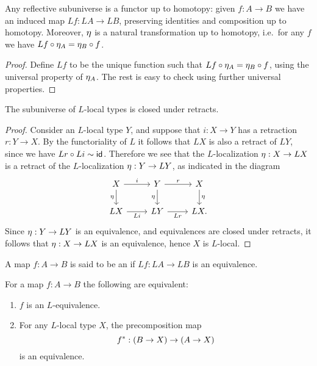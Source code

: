 \begin{lem}
  Any reflective subuniverse is a functor up to homotopy: given $f:A\to B$ we have an induced map $L f : L A \to L B$, preserving identities and composition up to homotopy.
  Moreover, $\modalunit$ is a natural transformation up to homotopy, i.e.\ for any $f$ we have $L f \circ \modalunit[A] = \modalunit[B] \circ f$.
\end{lem}

\begin{proof}
  Define $L f$ to be the unique function such that $L f \circ \modalunit[A] = \modalunit[B] \circ f$, using the universal property of $\modalunit[A]$.
  The rest is easy to check using further universal properties.
\end{proof}

\begin{cor}\label{cor:local_retract}
The subuniverse of $L$-local types is closed under retracts.
\end{cor}

\begin{proof}
Consider an $L$-local type $Y$, and suppose that $i:X\to Y$ has a retraction $r:Y\to X$. By the functoriality of $L$ it follows that $LX$ is also a retract of $LY$, since we have $Lr\circ Li\htpy \idfunc$. Therefore we see that the $L$-localization $\modalunit :X\to LX$ is a retract of the $L$-localization $\modalunit : Y\to LY$, as indicated in the diagram
\begin{equation*}
\begin{tikzcd}
X \arrow[r,"i"] \arrow[d,swap,"\modalunit"] & Y \arrow[d,swap,"\modalunit"] \arrow[r,"r"] & X \arrow[d,"\modalunit"] \\
LX \arrow[r,swap,"Li"] & LY \arrow[r,swap,"Lr"] & LX.
\end{tikzcd}
\end{equation*}
Since $\modalunit : Y\to LY$ is an equivalence, and equivalences are closed under retracts, it follows that $\modalunit :X\to LX$ is an equivalence, hence $X$ is $L$-local.
\end{proof}

\begin{defn}
A map $f:A\to B$ is said to be an  if $Lf:LA\to LB$ is an equivalence.
\end{defn}

\begin{prp}\label{lem:local_equivalence}
For a map $f : A \to B$ the following are equivalent:
\begin{enumerate}
\item $f$ is an $L$-equivalence.
\item For any $L$-local type $X$, the precomposition map
\begin{equation*}
\precomp{f} : (B \to X) \to (A \to X)
\end{equation*}
is an equivalence.
\end{enumerate}
\end{prp}

